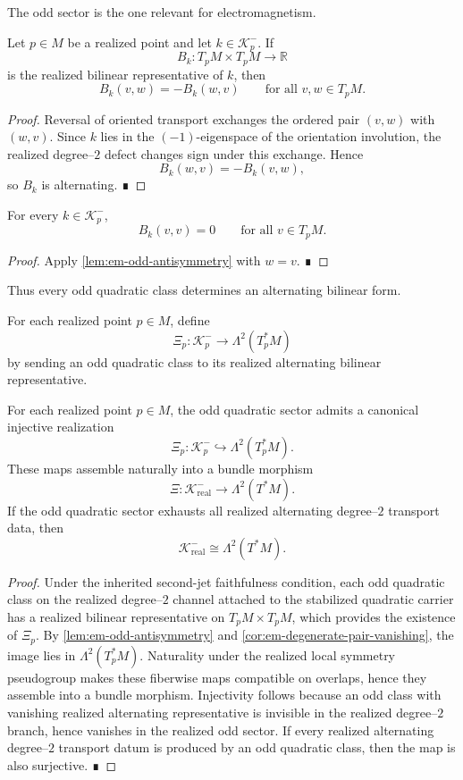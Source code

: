 The odd sector is the one relevant for electromagnetism.
\begin{lemma}
	\label{lem:em-odd-antisymmetry}
	Let \(p\in M\) be a realized point and let \(k\in\mathcal K^-_p\).
	If
	\[
		B_k:T_pM\times T_pM\to\mathbb R
	\]
	is the realized bilinear representative of \(k\), then
	\[
		B_k(v,w)=-B_k(w,v)
		\qquad
		\text{for all }v,w\in T_pM.
	\]
\end{lemma}
\begin{proof}
	Reversal of oriented transport exchanges the ordered pair
	\((v,w)\) with \((w,v)\).
	Since \(k\) lies in the \((-1)\)-eigenspace of the orientation
	involution, the realized degree--\(2\) defect changes sign under this
	exchange.
	Hence
	\[
		B_k(w,v)=-B_k(v,w),
	\]
	so \(B_k\) is alternating. ∎
\end{proof}
\begin{corollary}
	\label{cor:em-degenerate-pair-vanishing}
	For every \(k\in\mathcal K^-_p\),
	\[
		B_k(v,v)=0
		\qquad
		\text{for all }v\in T_pM.
	\]
\end{corollary}
\begin{proof}
	Apply \cref{lem:em-odd-antisymmetry} with \(w=v\). ∎
\end{proof}
Thus every odd quadratic class determines an alternating bilinear form.
\begin{definition}
	For each realized point \(p\in M\), define
	\[
		\Xi_p:\mathcal K^-_p\longrightarrow \Lambda^2(T_p^*M)
	\]
	by sending an odd quadratic class to its realized alternating bilinear
	representative.
\end{definition}
\begin{theorem}
	\label{thm:em-odd-twoform}
	For each realized point \(p\in M\), the odd quadratic sector admits a
	canonical injective realization
	\[
		\Xi_p:\mathcal K^-_p\hookrightarrow \Lambda^2(T_p^*M).
	\]
	These maps assemble naturally into a bundle morphism
	\[
		\Xi:\mathcal K^-_{\mathrm{real}}\to \Lambda^2(T^*M).
	\]
	If the odd quadratic sector exhausts all realized alternating degree--\(2\)
	transport data, then
	\[
		\mathcal K^-_{\mathrm{real}}\cong \Lambda^2(T^*M).
	\]
\end{theorem}
\begin{proof}
	Under the inherited second-jet faithfulness condition, each odd
	quadratic class on the realized degree--\(2\) channel attached to the
	stabilized quadratic carrier has a realized bilinear representative on
	\(T_pM\times T_pM\), which provides the existence of \(\Xi_p\).
	By \cref{lem:em-odd-antisymmetry} and
	\cref{cor:em-degenerate-pair-vanishing}, the image lies in
	\(\Lambda^2(T_p^*M)\).
	Naturality under the realized local symmetry pseudogroup makes these
	fiberwise maps compatible on overlaps, hence they assemble into a
	bundle morphism.
	Injectivity follows because an odd class with vanishing realized
	alternating representative is invisible in the realized degree--\(2\)
	branch, hence vanishes in the realized odd sector.
	If every realized alternating degree--\(2\) transport datum is produced
	by an odd quadratic class, then the map is also surjective. ∎
\end{proof}
